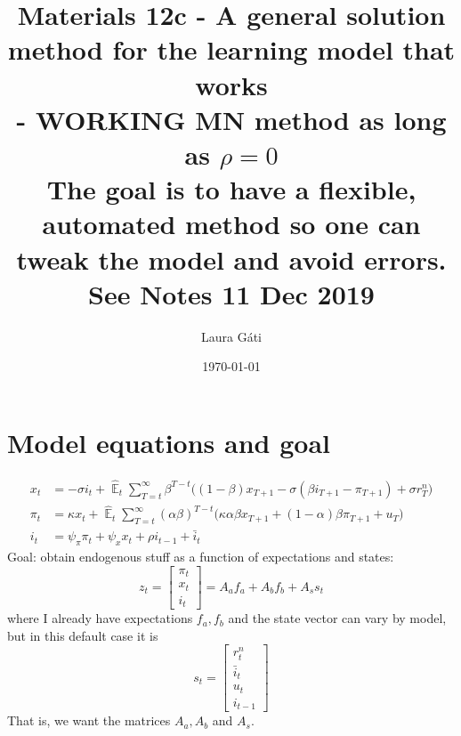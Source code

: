 \documentclass[11pt]{article}
\renewcommand{\[}{\begin{equation}}
\renewcommand{\]}{\end{equation}}
\DeclareMathOperator{\E}{\mathbb{E}}
\begin{document}
\linespread{1.0}

\title{Materials 12c - A general solution method for the learning model that works \\
- WORKING MN method as long as $\rho=0$
\\
\small{The goal is to have a flexible, automated method so one can tweak the model and avoid errors. \\See Notes 11 Dec 2019}}
\author{Laura G\'ati} 
\date{\today}
\maketitle




\section{Model equations and goal}
\begin{align}
x_t &=  -\sigma i_t +\hat{\E}_t \sum_{T=t}^{\infty} \beta^{T-t }\big( (1-\beta)x_{T+1} - \sigma(\beta i_{T+1} - \pi_{T+1}) +\sigma r_T^n \big)  \label{prestons18}  \\
\pi_t &= \kappa x_t +\hat{\E}_t \sum_{T=t}^{\infty} (\alpha\beta)^{T-t }\big( \kappa \alpha \beta x_{T+1} + (1-\alpha)\beta \pi_{T+1} + u_T\big) \label{prestons19}  \\
i_t &= \psi_{\pi}\pi_t + \psi_{x} x_t  + \rho i_{t-1} + \bar{i}_t \label{TR}
\end{align}
Goal: obtain endogenous stuff as a function of expectations and states:
\begin{equation}
z_t = \begin{bmatrix} \pi_t \\ x_t \\ i_t \end{bmatrix} = A_a f_{a} + A_b f_{b} + A_s s_t
\end{equation}
where I already have expectations $f_a, f_b$ and the state vector can vary by model, but in this default case it is \begin{equation}
s_t = \begin{bmatrix} r_t^n \\ \bar{i}_t \\ u_t \\ i_{t-1} \end{bmatrix}
\end{equation}
That is,  we want the matrices $A_a, A_b$ and $A_s$.
\end{document}
